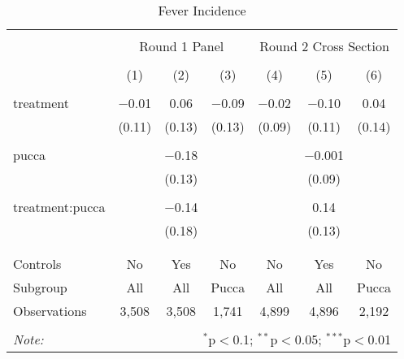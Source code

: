 
\begin{table}[!htbp] \centering 
  \caption{Fever Incidence} 
  \label{tbl:Fever Incidence} 
\begin{tabular}{@{\extracolsep{5pt}}lcccccc} 
\\[-1.8ex]\hline 
\hline \\[-1.8ex] 
 & \multicolumn{3}{c}{Round 1 Panel} & \multicolumn{3}{c}{Round 2 Cross Section} \\ 
\\[-1.8ex] & (1) & (2) & (3) & (4) & (5) & (6)\\ 
\hline \\[-1.8ex] 
 treatment & $-$0.01 & 0.06 & $-$0.09 & $-$0.02 & $-$0.10 & 0.04 \\ 
  & (0.11) & (0.13) & (0.13) & (0.09) & (0.11) & (0.14) \\ 
  & & & & & & \\ 
 pucca &  & $-$0.18 &  &  & $-$0.001 &  \\ 
  &  & (0.13) &  &  & (0.09) &  \\ 
  & & & & & & \\ 
 treatment:pucca &  & $-$0.14 &  &  & 0.14 &  \\ 
  &  & (0.18) &  &  & (0.13) &  \\ 
  & & & & & & \\ 
\hline \\[-1.8ex] 
Controls & No & Yes & No & No & Yes & No \\ 
Subgroup & All & All & Pucca & All & All & Pucca \\ 
Observations & 3,508 & 3,508 & 1,741 & 4,899 & 4,896 & 2,192 \\ 
\hline 
\hline \\[-1.8ex] 
\textit{Note:}  & \multicolumn{6}{r}{$^{*}$p$<$0.1; $^{**}$p$<$0.05; $^{***}$p$<$0.01} \\ 
\end{tabular} 
\end{table} 
